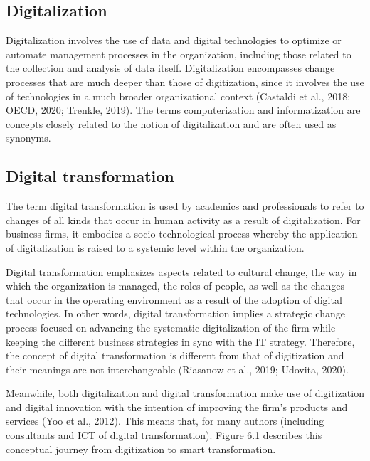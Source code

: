 \documentclass[
  letterpaper,
  DIV=11,
  numbers=noendperiod]{scrreprt}
\begin{document}
\hypertarget{digitalization}{%
\subsection{Digitalization}\label{digitalization}}

Digitalization involves the use of data and digital technologies to
optimize or automate management processes in the organization, including
those related to the collection and analysis of data itself.
Digitalization encompasses change processes that are much deeper than
those of digitization, since it involves the use of technologies in a
much broader organizational context (Castaldi et al., 2018; OECD, 2020;
Trenkle, 2019). The terms computerization and informatization are
concepts closely related to the notion of digitalization and are often
used as synonyms.

\hypertarget{digital-transformation}{%
\subsection{Digital transformation}\label{digital-transformation}}

The term digital transformation is used by academics and professionals
to refer to changes of all kinds that occur in human activity as a
result of digitalization. For business firms, it embodies a
socio-technological process whereby the application of digitalization is
raised to a systemic level within the organization.

Digital transformation emphasizes aspects related to cultural change,
the way in which the organization is managed, the roles of people, as
well as the changes that occur in the operating environment as a result
of the adoption of digital technologies. In other words, digital
transformation implies a strategic change process focused on advancing
the systematic digitalization of the firm while keeping the different
business strategies in sync with the IT strategy. Therefore, the concept
of digital transformation is different from that of digitization and
their meanings are not interchangeable (Riasanow et al., 2019; Udovita,
2020).

Meanwhile, both digitalization and digital transformation make use of
digitization and digital innovation with the intention of improving the
firm's products and services (Yoo et al., 2012). This means that, for
many authors (including consultants and ICT of digital transformation).
Figure 6.1 describes this conceptual journey from digitization to smart
transformation.
\end{document}
